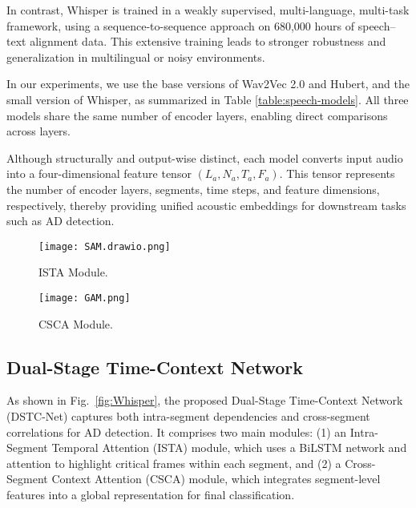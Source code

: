 \documentclass[journal]{IEEEtran}
\begin{document}
In contrast, Whisper is trained in a weakly supervised, multi-language, multi-task framework, using a sequence-to-sequence approach on 680,000 hours of speech–text alignment data. This extensive training leads to stronger robustness and generalization in multilingual or noisy environments.

In our experiments, we use the base versions of Wav2Vec 2.0 and Hubert, and the small version of Whisper, as summarized in Table \ref{table:speech-models}. 
All three models share the same number of encoder layers, enabling direct comparisons across layers.

Although structurally and output-wise distinct, each model converts input audio into a four-dimensional feature tensor $(L_a, N_a, T_a, F_a)$. This tensor represents the number of encoder layers, segments, time steps, and feature dimensions, respectively, thereby providing unified acoustic embeddings for downstream tasks such as AD detection.





\begin{figure}[htbp]
    \centering
    \begin{minipage}[b]{0.48\linewidth}
        \centering
        \texttt{[image: SAM.drawio.png]}
        \caption{ISTA Module.}
        \label{fig:sam}
    \end{minipage}
    \hfill
    \begin{minipage}[b]{0.48\linewidth}
        \centering
        \texttt{[image: GAM.png]}
        \caption{CSCA Module.}
        \label{fig:gam}
    \end{minipage}
\end{figure}

\subsection{Dual-Stage Time-Context Network}
As shown in Fig.~\ref{fig:Whisper}, the proposed Dual-Stage Time-Context Network (DSTC-Net) captures both intra-segment dependencies and cross-segment correlations for AD detection. It comprises two main modules: (1) an Intra-Segment Temporal Attention (ISTA) module, which uses a BiLSTM network and attention to highlight critical frames within each segment, and (2) a Cross-Segment Context Attention (CSCA) module, which integrates segment-level features into a global representation for final classification.
\end{document}
